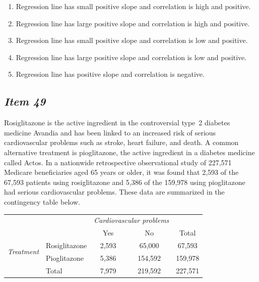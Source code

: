 \begin{enumerate} [leftmargin=1cm, itemsep=.2em]


\item Regression line has small positive slope and correlation is high and positive.


\item Regression line has large positive slope and correlation is high and positive.


\item Regression line has small positive slope and correlation is low and positive.


\item Regression line has large positive slope and correlation is low and positive.


\item Regression line has positive slope and correlation is negative.


\end{enumerate}





\subsection{\textbf{\textit{Item 49}}}








Rosiglitazone is the active ingredient in the controversial type~2 diabetes medicine Avandia and has been linked to an increased risk of serious cardiovascular problems such as stroke, heart failure, and death. A common alternative treatment is pioglitazone, the active ingredient in a diabetes medicine called Actos. In a nationwide retrospective observational study of 227,571 Medicare beneficiaries aged 65 years or older, it was found that 2,593 of the 67,593 patients using rosiglitazone and 5,386 of the 159,978 using pioglitazone had serious cardiovascular problems. These data are summarized in the contingency table below. 


\begin{center}


\begin{tabular}{ll cc c} 


& & \multicolumn{2}{c}{\textit{Cardiovascular problems}} \\


\cline{3-4} 


& & Yes & No & Total \\


\cline{2-5}


\multirow{2}{*}{\textit{Treatment}} & Rosiglitazone & 2,593 & 65,000 & 67,593 \\


& Pioglitazone & 5,386 & 154,592 & 159,978\\


\cline{2-5}


&Total & 7,979 & 219,592 & 227,571


\end{tabular}


\end{center}


